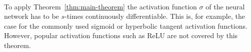 \begin{remark} \ \\
    To apply Theorem~\ref{thm:main-theorem} the activation function $\sigma$ of
    the neural network has to be $s$-times continuously differentiable. This is,
    for example, the case for the commonly used sigmoid or hyperbolic tangent
    activation functions. However, popular activation functions such as ReLU are not covered by this theorem.
\end{remark}
